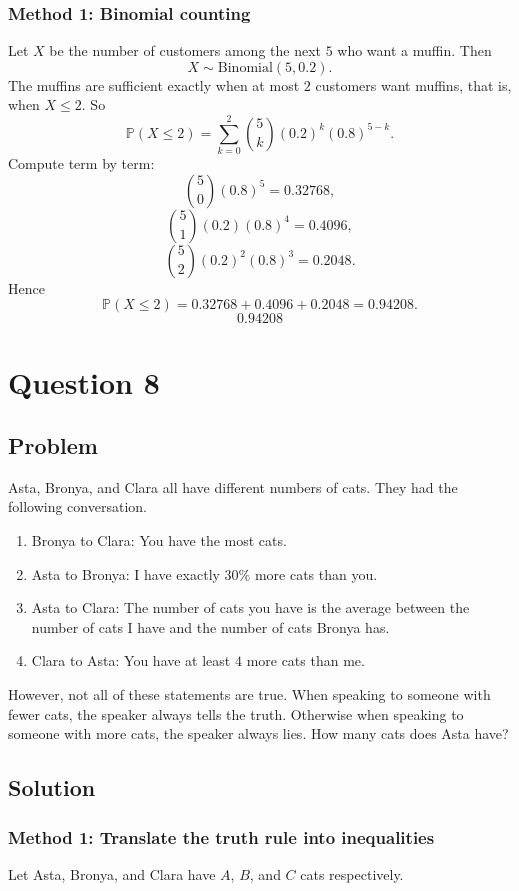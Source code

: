 \documentclass[12pt]{article}
\begin{document}
\subsubsection{Method 1: Binomial counting}
Let $X$ be the number of customers among the next $5$ who want a muffin. Then
\[
X \sim \mathrm{Binomial}(5,0.2).
\]
The muffins are sufficient exactly when at most $2$ customers want muffins, that is, when $X\le 2$.
So
\[
\mathbb{P}(X\le 2)
=
\sum_{k=0}^{2} \binom{5}{k}(0.2)^k(0.8)^{5-k}.
\]
Compute term by term:
\[
\binom{5}{0}(0.8)^5 = 0.32768,
\]
\[
\binom{5}{1}(0.2)(0.8)^4 = 0.4096,
\]
\[
\binom{5}{2}(0.2)^2(0.8)^3 = 0.2048.
\]
Hence
\[
\mathbb{P}(X\le 2)=0.32768+0.4096+0.2048=0.94208.
\]
\[
\boxed{0.94208}
\]

\newpage
\section{Question 8}
\subsection{Problem}
Asta, Bronya, and Clara all have different numbers of cats. They had the following conversation.

\begin{enumerate}[label=\roman*.]
    \item Bronya to Clara: You have the most cats.
    \item Asta to Bronya: I have exactly $30\%$ more cats than you.
    \item Asta to Clara: The number of cats you have is the average between the number of cats I have and the number of cats Bronya has.
    \item Clara to Asta: You have at least $4$ more cats than me.
\end{enumerate}

However, not all of these statements are true. When speaking to someone with fewer cats, the speaker always tells the truth. Otherwise when speaking to someone with more cats, the speaker always lies. How many cats does Asta have?

\subsection{Solution}
\subsubsection{Method 1: Translate the truth rule into inequalities}
Let Asta, Bronya, and Clara have $A$, $B$, and $C$ cats respectively.
\end{document}
